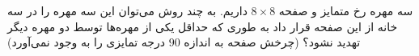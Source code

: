 \exercise
	سه مهره رخ متمایز و صفحه $8\times 8$ 
	داریم. به چند روش می‌توان این سه مهره را در سه خانه از این صفحه قرار داد به طوری که حداقل یکی از مهره‌ها توسط دو مهره دیگر تهدید نشود؟ (چرخش صفحه به اندازه $90$ درجه تمایزی را به وجود نمی‌آورد)
